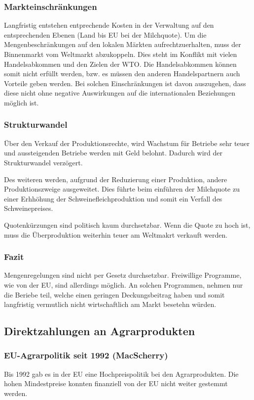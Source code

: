 \documentclass[11pt]{scrbook}
\begin{document}
\subsubsection{Markteinschränkungen}
Langfristig entstehen entprechende Kosten in der Verwaltung auf den entsprechenden Ebenen (Land bis \ac{EU} bei der Milchquote).
Um die Mengenbeschränkungen auf den lokalen Märkten aufrechtzuerhalten, muss der Binnenmarkt vom Weltmarkt abzukoppeln.
Dies steht im Konflikt mit vielen Handelsabkommen und den Zielen der \ac{WTO}.
Die Handelsabkommen können somit nicht erfüllt werden, bzw. es müssen den anderen Handelspartnern auch Vorteile geben werden.
Bei solchen Einschränkungen ist davon auszugehen, dass diese nicht ohne negative Auswirkungen auf die internationalen Beziehungen möglich ist.

\subsubsection{Strukturwandel}
Über den Verkauf der Produktionsrechte, wird Wachstum für Betriebe sehr teuer und aussteigenden Betriebe werden mit Geld belohnt.
Dadurch wird der Strukturwandel verzögert.

Des weiteren werden, aufgrund der Reduzierung einer Produktion, andere Produktionszweige ausgeweitet.
Dies führte beim einführen der Milchquote zu einer Erhhöhung der Schweinefleichproduktion und somit ein Verfall des Schweinepreises.

Quotenkürzungen sind politisch kaum durchsetzbar.
Wenn die Quote zu hoch ist, muss die Überproduktion weiterhin teuer am Weltmakrt verkauft werden.

\subsubsection{Fazit}
Mengenregelungen sind nicht per Gesetz durchsetzbar.
Freiwillige Programme, wie von der \ac{EU}, sind allerdings möglich.
An solchen Programmen, nehmen nur die Beriebe teil, welche einen geringen Deckungsbeitrag haben und somit langfristig vermutlich nicht wirtschaftlich am Markt besetehn würden.


\subsection{Direktzahlungen an Agrarprodukten}
\subsubsection{EU-Agrarpolitik seit 1992 (MacScherry)}
Bis 1992 gab es in der \ac{EU} eine Hochpreispolitik bei den Agrarprodukten.
Die hohen Mindestpreise konnten finanziell von der \ac{EU} nicht weiter gestemmt werden.
\end{document}
